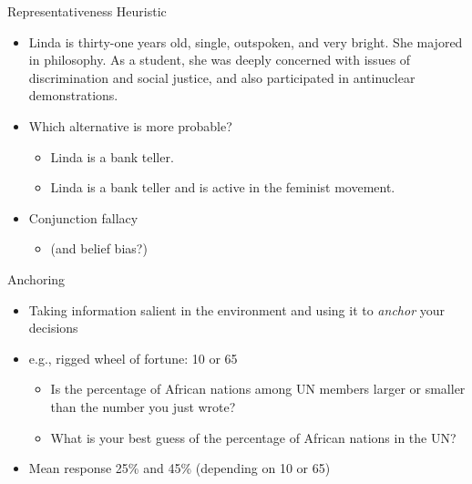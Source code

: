 \documentclass[
  ignorenonframetext,
]{beamer}
\providecommand{\tightlist}{%
  \setlength{\itemsep}{0pt}\setlength{\parskip}{0pt}}\usepackage{longtable,booktabs,array}
\begin{document}
\begin{frame}{Representativeness Heuristic}
\protect\hypertarget{representativeness-heuristic-1}{}
\begin{itemize}
\tightlist
\item
  Linda is thirty-one years old, single, outspoken, and very bright. She
  majored in philosophy. As a student, she was deeply concerned with
  issues of discrimination and social justice, and also participated in
  antinuclear demonstrations.
\end{itemize}

\begin{itemize}
\tightlist
\item
  Which alternative is more probable?

  \begin{itemize}
  \tightlist
  \item
    Linda is a bank teller.
  \item
    Linda is a bank teller and is active in the feminist movement.
  \end{itemize}
\item
  Conjunction fallacy

  \begin{itemize}
  \tightlist
  \item
    (and belief bias?)
  \end{itemize}
\end{itemize}
\end{frame}

\begin{frame}{Anchoring}
\protect\hypertarget{anchoring}{}
\begin{itemize}
\item
  Taking information salient in the environment and using it to
  \emph{anchor} your decisions
\item
  e.g., rigged wheel of fortune: 10 or 65

  \begin{itemize}
  \tightlist
  \item
    Is the percentage of African nations among UN members larger or
    smaller than the number you just wrote?
  \item
    What is your best guess of the percentage of African nations in the
    UN?
  \end{itemize}
\item
  Mean response 25\% and 45\% (depending on 10 or 65)
\end{itemize}
\end{frame}
\end{document}

